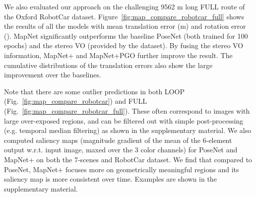 We also evaluated our approach on the challenging 9562 m long FULL route of the Oxford RobotCar
dataset. Figure~\ref{fig:map_compare_robotcar_full} shows the results of all the
models with mean translation error (m) and rotation error (\degree). 
MapNet significantly outperforms the baseline PoseNet (both trained for 100 epochs) and the stereo VO (provided by the dataset).
By fusing the stereo VO information, MapNet+ and MapNet+PGO further improve the result.
The cumulative distributions of the translation errors also show the large improvement over
the baselines. 

Note that there are some outlier predictions in both LOOP (Fig.~\ref{fig:map_compare_robotcar}) and FULL (Fig.~\ref{fig:map_compare_robotcar_full}).
These often correspond to images with large over-exposed regions, and can be filtered out with simple post-processing (e.g. temporal median filtering)
as shown in the supplementary material. We also computed saliency maps  (magnitude gradient of the mean of the 6-element output w.r.t. input image, maxed over the 3 color channels) for PoseNet
and MapNet+ on both the 7-scenes and RobotCar dataset. We find that compared to PoseNet, MapNet+ focuses more on geometrically meaningful regions
and its saliency map is more consistent over time. Examples are shown in the supplementary material.











